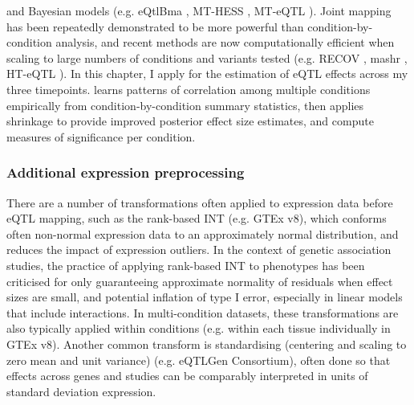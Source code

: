 and Bayesian models (e.g. eQtlBma \autocite{flutre2013StatisticalFrameworkJoint}, MT-HESS \autocite{lewin2016MTHESSEfficientBayesian}, MT-eQTL \autocite{li2018EmpiricalBayesApproach}).
Joint mapping has been repeatedly demonstrated to be more powerful than condition-by-condition analysis,
and recent methods are now computationally efficient when scaling to large numbers of conditions and variants tested (e.g. RECOV \autocite{duong2017ApplyingMetaanalysisGenotypetissue}, mashr \autocite{urbut2018FlexibleStatisticalMethods}, HT-eQTL \autocite{li2018HTeQTLIntegrativeExpression}).
In this chapter, I apply  \autocite{urbut2018FlexibleStatisticalMethods} for the estimation of \gls{eQTL} effects across my three timepoints.
 learns patterns of correlation among multiple conditions empirically from condition-by-condition summary statistics,
then applies shrinkage to provide improved posterior effect size estimates,
and compute measures of significance per condition. 


\subsubsection{Additional expression preprocessing}

There are a number of transformations often applied to expression data before \gls{eQTL} mapping, 
such as the rank-based \gls{INT} (e.g. GTEx v8\autocite{aguet2019GTExConsortiumAtlas}),
which conforms often non-normal expression data to an approximately normal distribution, and reduces the impact of expression outliers.
In the context of genetic association studies, the practice of applying rank-based \gls{INT} to phenotypes has been criticised for only guaranteeing approximate normality of residuals when effect sizes are small,
and potential inflation of type I error, especially in linear models that include interactions\autocite{beasley2009RankBasedInverseNormal}.
In multi-condition datasets, these transformations are also typically applied within conditions (e.g. within each tissue individually in GTEx v8\autocite{aguet2019GTExConsortiumAtlas}).
Another common transform is standardising (centering and scaling to zero mean and unit variance) (e.g. eQTLGen Consortium\autocite{vosa2018UnravelingPolygenicArchitecture}),
often done so that effects across genes and studies can be comparably interpreted in units of standard deviation expression\autocite{qi2018IdentifyingGeneTargets}.

